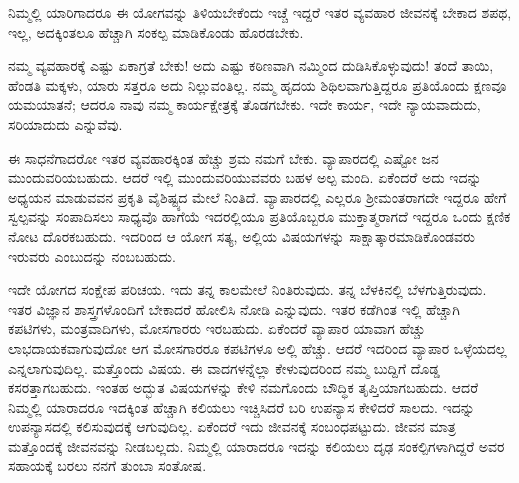 ನಿಮ್ಮಲ್ಲಿ ಯಾರಿಗಾದರೂ ಈ ಯೋಗವನ್ನು ತಿಳಿಯಬೇಕೆಂದು ಇಚ್ಚೆ ಇದ್ದರೆ ಇತರ ವ್ಯವಹಾರ ಜೀವನಕ್ಕೆ ಬೇಕಾದ ಶಪಥ, ಇಲ್ಲ, ಅದಕ್ಕಿಂತಲೂ ಹೆಚ್ಚಾಗಿ ಸಂಕಲ್ಪ ಮಾಡಿಕೊಂಡು ಹೊರಡಬೇಕು.

ನಮ್ಮ ವ್ಯವಹಾರಕ್ಕೆ ಎಷ್ಟು ಏಕಾಗ್ರತೆ ಬೇಕು! ಅದು ಎಷ್ಟು ಕಠಿಣವಾಗಿ ನಮ್ಮಿಂದ ದುಡಿಸಿಕೊಳ್ಳುವುದು! ತಂದೆ ತಾಯಿ, ಹೆಂಡತಿ ಮಕ್ಕಳು, ಯಾರು ಸತ್ತರೂ ಅದು ನಿಲ್ಲುವಂತಿಲ್ಲ. ನಮ್ಮ ಹೃದಯ ಶಿಥಿಲವಾಗುತ್ತಿದ್ದರೂ ಪ್ರತಿಯೊಂದು ಕ್ಷಣವೂ ಯಮಯಾತನೆ; ಆದರೂ ನಾವು ನಮ್ಮ ಕಾರ್ಯಕ್ಷೇತ್ರಕ್ಕೆ ತೊಡಗಬೇಕು. ಇದೇ ಕಾರ್ಯ, ಇದೇ ನ್ಯಾಯವಾದುದು, ಸರಿಯಾದುದು ಎನ್ನುವೆವು.

ಈ ಸಾಧನೆಗಾದರೋ ಇತರ ವ್ಯವಹಾರಕ್ಕಿಂತ ಹೆಚ್ಚು ಶ್ರಮ ನಮಗೆ ಬೇಕು. ವ್ಯಾಪಾರದಲ್ಲಿ ಎಷ್ಟೋ ಜನ ಮುಂದುವರಿಯಬಹುದು. ಆದರೆ ಇಲ್ಲಿ ಮುಂದುವರಿಯುವವರು ಬಹಳ ಅಲ್ಪ ಮಂದಿ. ಏಕೆಂದರೆ ಅದು ಇದನ್ನು ಅಧ್ಯಯನ ಮಾಡುವವನ ಪ್ರಕೃತಿ ವೈಶಿಷ್ಟ್ಯದ ಮೇಲೆ ನಿಂತಿದೆ. ವ್ಯಾಪಾರದಲ್ಲಿ ಎಲ್ಲರೂ ಶ‍್ರೀಮಂತರಾಗದೇ ಇದ್ದರೂ ಹೇಗೆ ಸ್ವಲ್ಪವನ್ನು ಸಂಪಾದಿಸಲು ಸಾಧ್ಯವೊ ಹಾಗೆಯೆ ಇದರಲ್ಲಿಯೂ ಪ್ರತಿಯೊಬ್ಬರೂ ಮುಕ್ತಾತ್ಮರಾಗದೆ ಇದ್ದರೂ ಒಂದು ಕ್ಷಣಿಕ ನೋಟ ದೊರಕಬಹುದು. ಇದರಿಂದ ಆ ಯೋಗ ಸತ್ಯ, ಅಲ್ಲಿಯ ವಿಷಯಗಳನ್ನು ಸಾಕ್ಷಾತ್ಕಾರಮಾಡಿಕೊಂಡವರು ಇರುವರು ಎಂಬುದನ್ನು ನಂಬಬಹುದು.

ಇದೇ ಯೋಗದ ಸಂಕ್ಷೇಪ ಪರಿಚಯ. ಇದು ತನ್ನ ಕಾಲಮೇಲೆ ನಿಂತಿರುವುದು. ತನ್ನ ಬೆಳಕಿನಲ್ಲಿ ಬೆಳಗುತ್ತಿರುವುದು. ಇತರ ವಿಜ್ಞಾನ ಶಾಸ್ತ್ರಗಳೊಂದಿಗೆ ಬೇಕಾದರೆ ಹೋಲಿಸಿ ನೋಡಿ ಎನ್ನುವುದು. ಇತರ ಕಡೆಗಿಂತ ಇಲ್ಲಿ ಹೆಚ್ಚಾಗಿ ಕಪಟಿಗಳು, ಮಂತ್ರವಾದಿಗಳು, ಮೋಸಗಾರರು ಇರಬಹುದು. ಏಕೆಂದರೆ ವ್ಯಾಪಾರ ಯಾವಾಗ ಹೆಚ್ಚು ಲಾಭದಾಯಕವಾಗುವುದೋ ಆಗ ಮೋಸಗಾರರೂ ಕಪಟಿಗಳೂ ಅಲ್ಲಿ ಹೆಚ್ಚು. ಆದರೆ ಇದರಿಂದ ವ್ಯಾಪಾರ ಒಳ್ಳೆಯದಲ್ಲ ಎನ್ನಲಾಗುವುದಿಲ್ಲ. ಮತ್ತೊಂದು ವಿಷಯ. ಈ ವಾದಗಳನ್ನೆಲ್ಲಾ ಕೇಳುವುದರಿಂದ ನಮ್ಮ ಬುದ್ದಿಗೆ ದೊಡ್ಡ ಕಸರತ್ತಾಗಬಹುದು. ಇಂತಹ ಅದ್ಭುತ ವಿಷಯಗಳನ್ನು ಕೇಳಿ ನಮಗೊಂದು ಬೌದ್ಧಿಕ ತೃಪ್ತಿಯಾಗಬಹುದು. ಆದರೆ ನಿಮ್ಮಲ್ಲಿ ಯಾರಾದರೂ ಇದಕ್ಕಿಂತ ಹೆಚ್ಚಾಗಿ ಕಲಿಯಲು ಇಚ್ಚಿಸಿದರೆ ಬರಿ ಉಪನ್ಯಾಸ ಕೇಳಿದರೆ ಸಾಲದು. ಇದನ್ನು ಉಪನ್ಯಾಸದಲ್ಲಿ ಕಲಿಸುವುದಕ್ಕೆ ಆಗುವುದಿಲ್ಲ. ಏಕೆಂದರೆ ಇದು ಜೀವನಕ್ಕೆ ಸಂಬಂಧಪಟ್ಟುದು. ಜೀವನ ಮಾತ್ರ ಮತ್ತೊಂದಕ್ಕೆ ಜೀವನವನ್ನು ನೀಡಬಲ್ಲದು. ನಿಮ್ಮಲ್ಲಿ ಯಾರಾದರೂ ಇದನ್ನು ಕಲಿಯಲು ದೃಢ ಸಂಕಲ್ಪಿಗಳಾಗಿದ್ದರೆ ಅವರ ಸಹಾಯಕ್ಕೆ ಬರಲು ನನಗೆ ತುಂಬಾ ಸಂತೋಷ.


